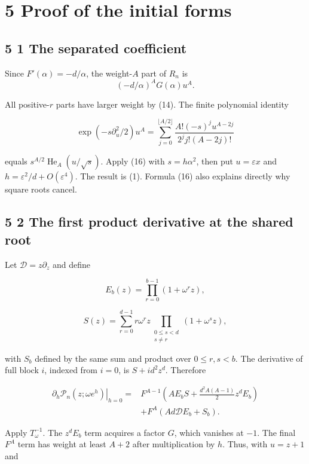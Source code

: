 \documentclass[
  11pt,
]{article}
\begin{document}
\section{5 Proof of the initial forms}\label{proof-of-the-initial-forms}

\subsection{5 1 The separated
coefficient}\label{the-separated-coefficient}

Since \(F'(\alpha)=-d/\alpha\), the weight-\(A\) part of \(R_n\) is
\nopagebreak[4]
\[
(-d/\alpha)^A G(\alpha)u^A.
\]

All positive-\(r\) parts have larger weight by (14). The finite
polynomial identity

\[
\exp(-s\partial_u^2/2)u^A
=\sum_{j=0}^{\lfloor A/2\rfloor}
\frac{A!(-s)^j u^{A-2j}}{2^j j!(A-2j)!} \tag{16}
\]

equals \(s^{A/2}\operatorname{He}_A(u/\sqrt s)\). Apply (16) with
\(s=h\alpha^2\), then put \(u=\varepsilon x\) and
\(h=\varepsilon^2/d+O(\varepsilon^4)\). The result is (1). Formula (16)
also explains directly why square roots cancel.

\subsection{5 2 The first product derivative at the shared
root}\label{the-first-product-derivative-at-the-shared-root}

Let \(\mathcal D=z\partial_z\) and define

\[
E_b(z)=\prod_{r=0}^{b-1}(1+\omega^rz),
\]

\[
S(z)=\sum_{r=0}^{d-1}r\omega^rz
\prod_{\substack{0\leq s<d\\s\ne r}}(1+\omega^sz),
\]

with \(S_b\) defined by the same sum and product over \(0\leq r,s<b\).
The derivative of full block \(i\), indexed from \(i=0\), is
\(S+id^2z^d\). Therefore

\[
\begin{aligned}
\left.\partial_h\mathcal P_n(z;\omega e^h)\right|_{h=0}
={}&F^{A-1}\left(AE_bS+\frac{d^2A(A-1)}2z^dE_b\right)\\
&+F^A\left(Ad\mathcal D E_b+S_b\right).
\end{aligned} \tag{17}
\]

Apply \(T_\omega^{-1}\). The \(z^dE_b\) term acquires a factor \(G\),
which vanishes at \(-1\). The final \(F^A\) term has weight at least
\(A+2\) after multiplication by \(h\). Thus, with \(u=z+1\) and
\end{document}
